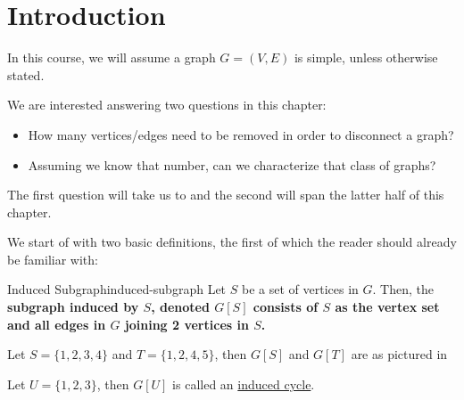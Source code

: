 \section{Introduction}

\begin{note}
    In this course, we will assume a graph $G = (V, E)$ is simple, unless otherwise stated.
\end{note}

We are interested answering two questions in this chapter:
\begin{itemize}
    \item How many vertices/edges need to be removed in order to disconnect a graph?
    \item Assuming we know that number, can we characterize that class of graphs?
\end{itemize}
The first question will take us to  and the second will span the latter half of this chapter.

We start of with two basic definitions, the first of which the reader should already be familiar with:

\begin{definition}{Induced Subgraph}{induced-subgraph}
    Let $S$ be a set of vertices in $G$. Then, the \bf{subgraph induced} by $S$, denoted $G[S]$ consists of $S$ as the vertex set and all edges in $G$ joining 2 vertices in $S$.
\end{definition}


\begin{example}
    Let $S = \{1, 2, 3, 4\}$ and $T = \{1, 2, 4, 5\}$, then $G[S]$ and $G[T]$ are as pictured in 
\end{example}

\begin{example}
    Let $U = \{1, 2, 3\}$, then $G[U]$ is called an \ul{induced cycle}. 
\end{example}

